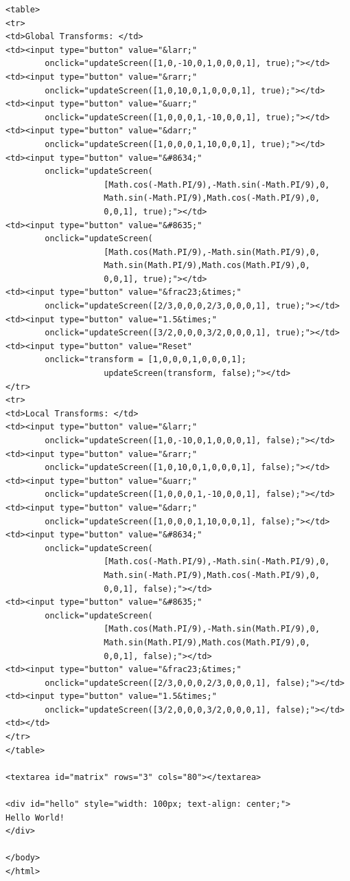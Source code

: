 \documentclass{book}
\begin{document}
\begin{lstlisting}
<table>
<tr>
<td>Global Transforms: </td>
<td><input type="button" value="&larr;"
        onclick="updateScreen([1,0,-10,0,1,0,0,0,1], true);"></td>
<td><input type="button" value="&rarr;"
        onclick="updateScreen([1,0,10,0,1,0,0,0,1], true);"></td>
<td><input type="button" value="&uarr;"
        onclick="updateScreen([1,0,0,0,1,-10,0,0,1], true);"></td>
<td><input type="button" value="&darr;"
        onclick="updateScreen([1,0,0,0,1,10,0,0,1], true);"></td>        
<td><input type="button" value="&#8634;"
        onclick="updateScreen(
                    [Math.cos(-Math.PI/9),-Math.sin(-Math.PI/9),0,
                    Math.sin(-Math.PI/9),Math.cos(-Math.PI/9),0,
                    0,0,1], true);"></td>
<td><input type="button" value="&#8635;"
        onclick="updateScreen(
                    [Math.cos(Math.PI/9),-Math.sin(Math.PI/9),0,
                    Math.sin(Math.PI/9),Math.cos(Math.PI/9),0,
                    0,0,1], true);"></td>
<td><input type="button" value="&frac23;&times;"
        onclick="updateScreen([2/3,0,0,0,2/3,0,0,0,1], true);"></td>
<td><input type="button" value="1.5&times;"
        onclick="updateScreen([3/2,0,0,0,3/2,0,0,0,1], true);"></td>
<td><input type="button" value="Reset"
        onclick="transform = [1,0,0,0,1,0,0,0,1];
                    updateScreen(transform, false);"></td>
</tr>
<tr>
<td>Local Transforms: </td>
<td><input type="button" value="&larr;"
        onclick="updateScreen([1,0,-10,0,1,0,0,0,1], false);"></td>
<td><input type="button" value="&rarr;"
        onclick="updateScreen([1,0,10,0,1,0,0,0,1], false);"></td>
<td><input type="button" value="&uarr;"
        onclick="updateScreen([1,0,0,0,1,-10,0,0,1], false);"></td>
<td><input type="button" value="&darr;"
        onclick="updateScreen([1,0,0,0,1,10,0,0,1], false);"></td>        
<td><input type="button" value="&#8634;"
        onclick="updateScreen(
                    [Math.cos(-Math.PI/9),-Math.sin(-Math.PI/9),0,
                    Math.sin(-Math.PI/9),Math.cos(-Math.PI/9),0,
                    0,0,1], false);"></td>
<td><input type="button" value="&#8635;"
        onclick="updateScreen(
                    [Math.cos(Math.PI/9),-Math.sin(Math.PI/9),0,
                    Math.sin(Math.PI/9),Math.cos(Math.PI/9),0,
                    0,0,1], false);"></td>
<td><input type="button" value="&frac23;&times;"
        onclick="updateScreen([2/3,0,0,0,2/3,0,0,0,1], false);"></td>
<td><input type="button" value="1.5&times;"
        onclick="updateScreen([3/2,0,0,0,3/2,0,0,0,1], false);"></td>
<td></td>
</tr>
</table>

<textarea id="matrix" rows="3" cols="80"></textarea>
    
<div id="hello" style="width: 100px; text-align: center;">
Hello World!
</div>

</body>
</html>
\end{lstlisting}
\end{document}
